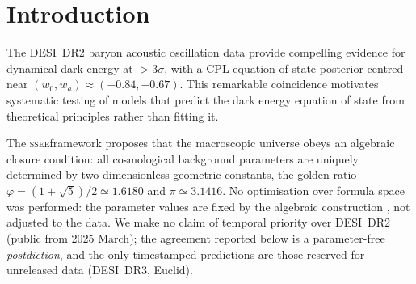 \documentclass[12pt,a4paper]{article}
\newcommand{\SSEE}{\textsc{ssee}}
\newcommand{\phiG}{\varphi}
\newcommand{\KAL}{\mathrm{KAL}_0}
\newcommand{\MIRA}{\mathcal{M}}
\newcommand{\AURA}{\mathrm{AURA}}
\newcommand{\wz}{w_0}
\newcommand{\wa}{w_a}
\newcommand{\alphaK}{\alpha_K}
\begin{document}
\begin{abstract}
We additionally summarise three theoretical extensions of the framework.
In the strong-field regime Paper~8 analyses two limits: an alternative
MOND-like limit in which the photon deflection is amplified by
$\sqrt{\AURA}\approx 1.9995$ (numerically close to $\MIRA$ at $0.03\%$ but
algebraically distinct), and the canonical limit with EFT
$\alpha_B=\alpha_M=\alpha_T=0$ in which the residual fifth-force is
suppressed to $F_\phi/F_N\sim 10^{-15}$ and the observable lensing recovers
GR; current SLACS/BELLS data favour the canonical limit (Paper~8;
OPEN\_PROBLEMS.md OP-13). A late-time local screening fraction
$f_{\rm scr}^{\rm IR}=\alphaK/(3\MIRA)=(\pi-\phiG)/(\phiG+\pi)^2\simeq0.067$ relates
the locally measured rate to the global background. The measured datum is the
input and the global rate is the output:
$H_0^{\rm glob,IR}=H_0^{\rm SH0ES}(1-f_{\rm scr}^{\rm IR})=68.13$~km\,s$^{-1}$\,Mpc$^{-1}$,
which sits $0.17\sigma$ from the pure number $3(\phiG+\pi)^2=67.96214$; with the
full infrared-plus-ultraviolet fraction $f_{\rm scr}^{\rm full}=0.069522$ the same
operation returns $67.962142$, a residual of $+4.2\times10^{-6}$ against that
number, in both cases with zero free parameters (Papers~9 and~10).
A UV completion $K(X)=X/\KAL+X^2/M^4$ with algebraic cutoff $M=9.68$~meV
connects the dark-energy EFT to the inflationary $\alpha$-attractor (Paper~10).
All model parameters are falsifiable by named forthcoming experiments.
\end{abstract}

\clearpage
\tableofcontents
\clearpage
\newpage

\section{Introduction}
\label{sec:intro}

The DESI~DR2 baryon acoustic oscillation data \citep{AbdulKarim2025} provide
compelling evidence for dynamical dark energy at $>3\sigma$, with a CPL
equation-of-state posterior centred near $(\wz,\wa) \approx (-0.84, -0.67)$.
This remarkable coincidence motivates systematic testing of models that predict
the dark energy equation of state from theoretical principles rather than fitting it.

The \SSEE framework proposes that the macroscopic universe obeys an
algebraic closure condition: all cosmological background parameters are uniquely
determined by two dimensionless geometric constants, the golden ratio
$\phiG = (1+\sqrt{5})/2 \simeq 1.6180$ and $\pi \simeq 3.1416$.
No optimisation over formula space was performed: the parameter values are fixed
by the algebraic construction \citep{AlmeidaSSEE2026genesis}, not adjusted to the
data. We make no claim of temporal priority over DESI~DR2 (public from 2025 March);
the agreement reported below is a parameter-free \emph{postdiction}, and the only
timestamped predictions are those reserved for unreleased data (DESI~DR3, Euclid).
\end{document}
